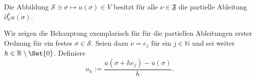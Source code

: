 \begin{Satz}
\label{satz:cha3:existenz_part_ableitung}
    Die Abbildung $\mathcal S \ni \sigma \mapsto u(\sigma) \in V$ besitzt für alle $\nu \in \mathfrak F$ die partielle Ableitung $\partial^{\nu}_{\sigma} u(\sigma)$.


    \begin{Beweis}
        Wir zeigen die Behauptung exemplarisch für für die partiellen Ableitungen erster Ordnung für ein festes $\sigma \in \mathcal S$.
        Seien dazu $\nu = e_{j}$ für ein $j \in \mathbb{N}$ und sei weiter $h \in \mathbb{R} \setminus \Set{ 0 }$.
        Definiere
        \begin{equation}
            u_{h} := \frac{u(\sigma + h e_{j}) - u(\sigma)}{h}.
        \end{equation}


\end{Beweis}
\end{Satz}
